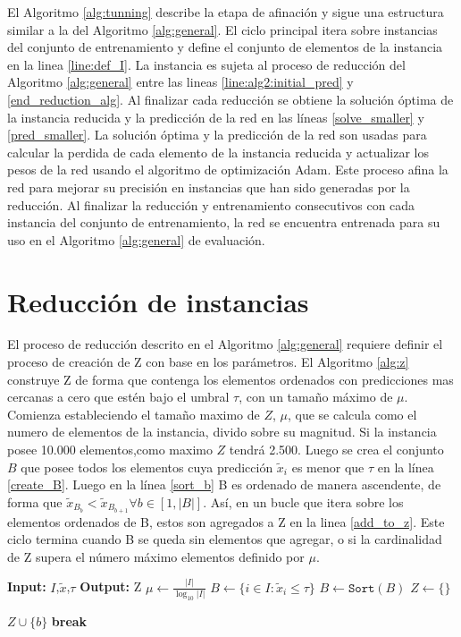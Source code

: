 \documentclass[spanish, a4paper, 12pt, openany,final]{book}
\begin{document}
El Algoritmo \ref{alg:tunning} describe la etapa de afinación y sigue una estructura similar a la del Algoritmo \ref{alg:general}. El ciclo principal itera sobre instancias del conjunto de entrenamiento y define el conjunto de elementos de la instancia en la linea \ref{line:def_I}. La instancia es sujeta al proceso de reducción del Algoritmo \ref{alg:general} entre las lineas \ref{line:alg2:initial_pred} y \ref{end_reduction_alg}. Al finalizar cada reducción se obtiene la solución óptima de la instancia reducida y la predicción de la red en las líneas \ref{solve_smaller} y \ref{pred_smaller}. La solución óptima y la predicción de la red son usadas para calcular la perdida de cada elemento de la instancia reducida y actualizar los pesos de la red usando el algoritmo de optimización Adam. Este proceso afina la red para mejorar su precisión en instancias que han sido generadas por la reducción. Al finalizar la reducción y entrenamiento consecutivos con cada instancia del conjunto de entrenamiento, la red se encuentra entrenada para su uso en el Algoritmo \ref{alg:general} de evaluación.


 \section{Reducción de instancias}
 
 
 El proceso de reducción descrito en el Algoritmo \ref{alg:general} requiere definir el proceso de creación de Z con base en los parámetros. El Algoritmo \ref{alg:z} construye Z de forma que contenga los elementos ordenados con predicciones mas cercanas a cero que estén bajo el umbral $\tau$, con un tamaño máximo de $\mu$. Comienza estableciendo el tamaño maximo de $Z$, $\mu$, que se calcula como el numero de elementos de la instancia, divido sobre su magnitud. Si la instancia posee 10.000 elementos,como maximo $Z$ tendrá 2.500. Luego se crea el conjunto $B$ que posee todos los elementos cuya predicción $\tilde{x}_i$ es menor que $\tau$ en la línea \ref{create_B}. Luego en la línea  \ref{sort_b} B es ordenado de manera ascendente, de forma que $\tilde{x}_{B_b} < \tilde{x}_{B_{b+1}}   \forall b \in [1,|B|]$. Así, en un bucle que itera sobre los elementos ordenados de B, estos son agregados a Z en la linea \ref{add_to_z}. Este ciclo termina cuando B se queda sin elementos que agregar, o si la cardinalidad de Z supera el número máximo elementos definido por $\mu$.
 
    \begin{algorithm}[H]
 	\caption{$Z(I,\tilde{x},\tau)$}\label{alg:z}
 	\begin{algorithmic}[1]
 		\Statex \textbf{Input:} $I$,$\tilde{x}$,$\tau$
 		\Statex \textbf{Output:} Z
 		\State $\mu \gets \frac{|I|}{\log_{10}{|I|}}$ \label{alg2:def_mu} 
 		\State $B \gets \{ i \in I: \tilde{x}_i \leq \tau \}$ \label{create_B}
 		\State $B \gets \mathtt{Sort}(B)$  \label{sort_b}
 		\State $Z \gets \{\}$	  
 		
 		\State $Z \cup \{b\} $ \label{add_to_z}
 		\label{if_c}
 		\State \textbf{break} \label{break}
 		\EndIf
 		\EndFor
 	\end{algorithmic}
 \end{algorithm}
 
\end{document}
